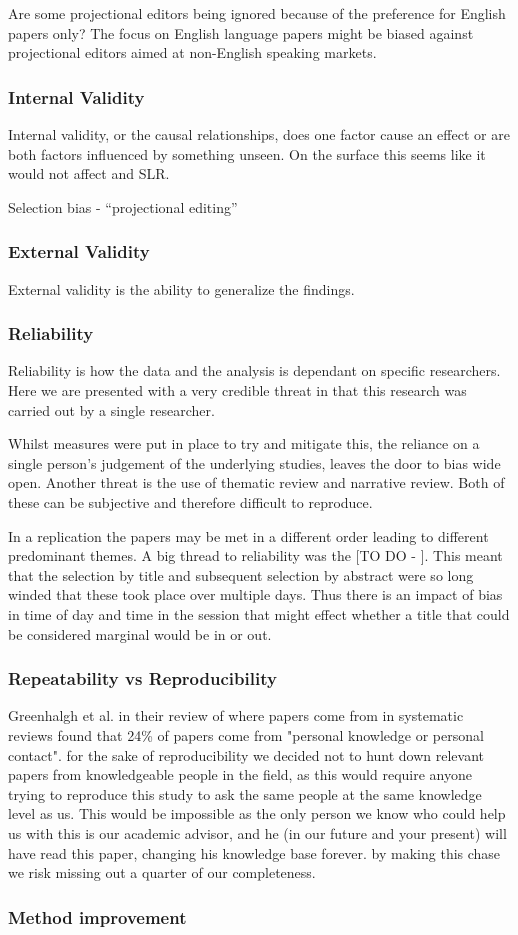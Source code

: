 Are some projectional editors being ignored because of the preference for English papers only?
The focus on English language papers might be biased against projectional editors aimed at non-English speaking markets.


\subsubsection{Internal Validity}
Internal validity, or the causal relationships, does one factor cause an effect or are both factors influenced by something unseen.
On the surface this seems like it would not affect and SLR.


Selection bias - ``projectional editing''

\subsubsection{External Validity}
External validity is the ability to generalize the findings.

\subsubsection{Reliability}
Reliability is how the data and the analysis is dependant on specific researchers.
Here we are presented with a very credible threat in that this research was carried out by a single researcher.

Whilst measures were put in place to try and mitigate this, the reliance on a single person's judgement of the underlying studies, leaves the door to bias wide open.
Another threat is the use of thematic review and narrative review. 
Both of these can be subjective and therefore difficult to reproduce.

In a replication the papers may be met in a different order leading to different predominant themes. 
A big thread to reliability was the [TO DO - ].  
This meant that the selection by title and subsequent selection by abstract were so long winded that these took place over multiple days. 
Thus there is an impact of bias in time of day and time in the session that might effect whether a title that could be considered marginal would be in or out.


\subsubsection{Repeatability vs Reproducibility}
Greenhalgh et al.\cite{GreenhalghTrisha2005Eaeo} in their review of where papers come from in systematic reviews found that 24\% of papers come from "personal knowledge or personal contact".
for the sake of reproducibility we decided not to hunt down relevant papers from knowledgeable people in the field, as this would require anyone trying to reproduce this study to ask the same people at the same knowledge level as us.
This would be impossible as the only person we know who could help us with this is our academic advisor, and he (in our future and your present) will have read this paper, changing his knowledge base forever.
by making this chase we risk missing out a quarter of our completeness.

\subsubsection{Method improvement}


